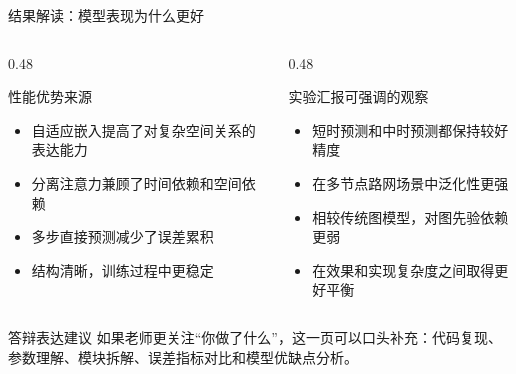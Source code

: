 \documentclass[10pt,aspectratio=169]{ctexbeamer}
\begin{document}
\begin{frame}{结果解读：模型表现为什么更好}
  \begin{columns}[T]
    \begin{column}{0.48\textwidth}
      \begin{block}{性能优势来源}
        \begin{itemize}
          \item 自适应嵌入提高了对复杂空间关系的表达能力
          \item 分离注意力兼顾了时间依赖和空间依赖
          \item 多步直接预测减少了误差累积
          \item 结构清晰，训练过程中更稳定
        \end{itemize}
      \end{block}
    \end{column}
    \begin{column}{0.48\textwidth}
      \begin{block}{实验汇报可强调的观察}
        \begin{itemize}
          \item 短时预测和中时预测都保持较好精度
          \item 在多节点路网场景中泛化性更强
          \item 相较传统图模型，对图先验依赖更弱
          \item 在效果和实现复杂度之间取得更好平衡
        \end{itemize}
      \end{block}
    \end{column}
  \end{columns}

  \vspace{0.1cm}
  \begin{alertblock}{答辩表达建议}
    如果老师更关注“你做了什么”，这一页可以口头补充：代码复现、参数理解、模块拆解、误差指标对比和模型优缺点分析。
  \end{alertblock}
\end{frame}
\end{document}
